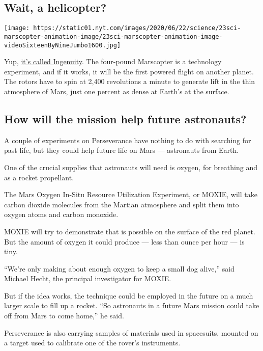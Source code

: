 \hypertarget{wait-a-helicopter}{%
\subsection{Wait, a helicopter?}\label{wait-a-helicopter}}

\texttt{[image: https://static01.nyt.com/images/2020/06/22/science/23sci-marscopter-animation-image/23sci-marscopter-animation-image-videoSixteenByNineJumbo1600.jpg]}

Yup,
\href{https://www.nytimes.com/2020/06/23/science/mars-helicopter-nasa.html}{it's
called Ingenuity}. The four-pound Marscopter is a technology experiment,
and if it works, it will be the first powered flight on another planet.
The rotors have to spin at 2,400 revolutions a minute to generate lift
in the thin atmosphere of Mars, just one percent as dense at Earth's at
the surface.

\hypertarget{how-will-the-mission-help-future-astronauts}{%
\subsection{How will the mission help future
astronauts?}\label{how-will-the-mission-help-future-astronauts}}

A couple of experiments on Perseverance have nothing to do with
searching for past life, but they could help future life on Mars ---
astronauts from Earth.

One of the crucial supplies that astronauts will need is oxygen, for
breathing and as a rocket propellant.

The Mars Oxygen In-Situ Resource Utilization Experiment, or MOXIE, will
take carbon dioxide molecules from the Martian atmosphere and split them
into oxygen atoms and carbon monoxide.

MOXIE will try to demonstrate that is possible on the surface of the red
planet. But the amount of oxygen it could produce --- less than ounce
per hour --- is tiny.

``We're only making about enough oxygen to keep a small dog alive,''
said Michael Hecht, the principal investigator for MOXIE.

But if the idea works, the technique could be employed in the future on
a much larger scale to fill up a rocket. ``So astronauts in a future
Mars mission could take off from Mars to come home,'' he said.

Perseverance is also carrying samples of materials used in spacesuits,
mounted on a target used to calibrate one of the rover's instruments.

